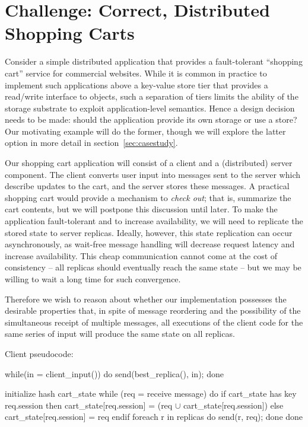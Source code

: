 \section{Challenge: Correct, Distributed Shopping Carts}

Consider a simple distributed application that provides a fault-tolerant
``shopping cart'' service for commercial websites.  While it is common in
practice to implement such applications above a key-value store tier that
provides a read/write interface to objects, such a separation of tiers limits
the ability of the storage substrate to exploit application-level semantics.
Hence a design decision needs to be made: should the application provide 
its own storage or use a store?  Our motivating example will do the former,
though we will explore the latter option in more detail in section~\ref{sec:casestudy}.

Our shopping cart application will consist of a client and a (distributed)
server component.  The client converts user input into messages sent to
the server which describe updates to the cart, and the server stores these 
messages.  
A practical shopping cart would provide a mechanism to {\em check out}; that is,
summarize the cart contents, but we will postpone this discussion until later.
To make the application fault-tolerant and to increase availability, 
we will need to replicate the stored state to server replicas.  Ideally, however,
this state replication can occur asynchronously, as wait-free message handling
will decrease request latency and increase availability.  This cheap communication
cannot come at the cost of consistency -- all replicas should eventually reach
the same state -- but we may be willing to wait a long time for such convergence.

Therefore we wish to reason about whether our implementation possesses the desirable 
properties that, in spite of message reordering and the possibility of the simultaneous
receipt of multiple messages, all executions of the client code for the same series of
input will produce the same state on all replicas.  


Client pseudocode:

\begin{Dedalus}
while(in = client_input()) do
  send(best_replica(), in);
done
\end{Dedalus}

\begin{Dedalus}
initialize hash cart_state
while (req = receive message) do
  if cart_state has key req.session then
     cart_state[req.session] =  (req \(\cup\) cart_state[req.session]) 
  else 
    cart_state[req.session] = { req } 
  endif
  foreach r in replicas do
    send(r, req);
  done
done
\end{Dedalus}




